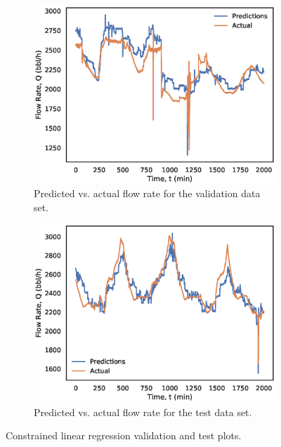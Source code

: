 \begin{figure}[h]
     \centering
     \begin{subfigure}[b]{0.48\textwidth}
         \centering
         \includegraphics[width=\textwidth]{images/08ConstrainedLS_validation.eps}
         \caption{Predicted vs. actual flow rate for the validation data set.}
         \label{fig:08CLSValidation}
     \end{subfigure}
     \hfill
     \begin{subfigure}[b]{0.48\textwidth}
         \centering
         \includegraphics[width=\textwidth]{images/08ConstrainedLS_test.eps}
         \caption{Predicted vs. actual flow rate for the test data set.}
         \label{fig:08CLSTest}
     \end{subfigure}
        \caption{Constrained linear regression validation and test plots.}
        \label{fig:08CLSPlots}
\end{figure}

